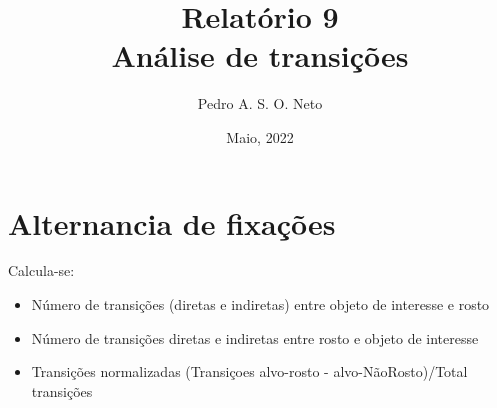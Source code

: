 \documentclass{article}
\title{Relatório 9 \\ Análise de transições}
\author{Pedro A. S. O. Neto}
\date{Maio, 2022}
\begin{document}
\maketitle

\section{Alternancia de fixações}

Calcula-se:

\begin{itemize}
  \item Número de transições (diretas e indiretas) entre objeto de interesse e rosto
  \item Número de transições diretas e indiretas entre rosto e objeto de interesse 
  \item Transições normalizadas (Transiçoes alvo-rosto - alvo-NãoRosto)/Total transições
\end{itemize}

\end{document}
